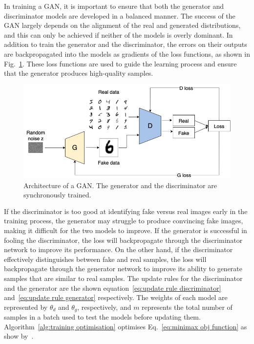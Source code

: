 \noindent In training a GAN, it is important to ensure that both the generator and discriminator models are developed in a balanced manner. The success of the GAN largely depends on the alignment of the real and generated distributions, and this can only be achieved if neither of the models is overly dominant.
In addition to train the generator and the discriminator, the errors on their outputs are backpropagated into the models as gradients of the loss functions, as shown in Fig.~\ref{fig:GAN architecture w loss}. These loss functions are used to guide the learning process and ensure that the generator produces high-quality samples.
\begin{figure}[!ht]
\centering
  \includegraphics[scale=0.4]{figures/gan-architecture.png}
  \caption{Architecture of a GAN. The generator and the discriminator are synchronously trained.}
  \label{fig:GAN architecture w loss}
\end{figure}
If the discriminator is too good at identifying fake versus real images early in the training process, the generator may struggle to produce convincing fake images, making it difficult for the two models to improve. If the generator is successful in fooling the discriminator, the loss will backpropagate through the discriminator network to improve its performance. On the other hand, if the discriminator effectively distinguishes between fake and real samples, the loss will backpropagate through the generator network to improve its ability to generate samples that are similar to real samples.
The update rules for the discriminator and the generator are the shown equation~\ref{eq:update rule discriminator} and~\ref{eq:update rule generator} respectively. The weights of each model are represented by $\theta_d$ and $\theta_g$, respectively, and $m$ represents the total number of samples in a batch used to test the models before updating them. Algorithm~\ref{alg:training optimisation} optimises Eq.~\ref{eq:minimax obj function} as show by~\cite{GANGoodfellow}.

